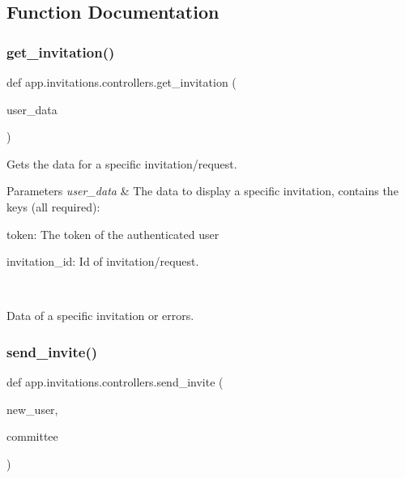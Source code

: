 \subsection{Function Documentation}
\mbox{\label{namespaceapp_1_1invitations_1_1controllers_aec05f77e1fcf926dfc05239d1272e3e3}} 
\subsubsection{\texorpdfstring{get\+\_\+invitation()}{get\_invitation()}}
{\footnotesize\ttfamily def app.\+invitations.\+controllers.\+get\+\_\+invitation (\begin{DoxyParamCaption}\item[{}]{user\+\_\+data }\end{DoxyParamCaption})}



Gets the data for a specific invitation/request. 


\begin{DoxyParams}{Parameters}
{\em user\+\_\+data} & The data to display a specific invitation, contains the keys (all required)\+:
\begin{DoxyItemize}
\item token\+: The token of the authenticated user
\item invitation\+\_\+id\+: Id of invitation/request.
\end{DoxyItemize}\\
\hline
\end{DoxyParams}
Data of a specific invitation or errors. \mbox{\label{namespaceapp_1_1invitations_1_1controllers_ac9d6b41452741ffa83fd04f7f935dd4b}} 
\subsubsection{\texorpdfstring{send\+\_\+invite()}{send\_invite()}}
{\footnotesize\ttfamily def app.\+invitations.\+controllers.\+send\+\_\+invite (\begin{DoxyParamCaption}\item[{}]{new\+\_\+user,  }\item[{}]{committee }\end{DoxyParamCaption})}



